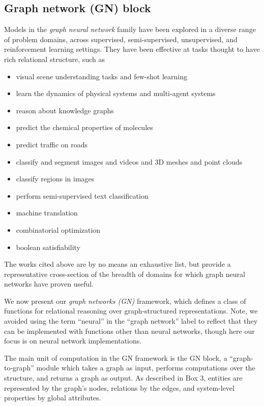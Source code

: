 \documentclass[10pt]{book}
\let\defaultmarginpar\marginpar
\renewcommand\marginpar[2][]{\defaultmarginpar{\itshape\color{gray}#2}}
\begin{document}
\subsection{Graph network (GN) block}
\label{sec:model-computational}

Models in the \emph{graph neural network}\marginpar{graph neural networks} family have been explored in a diverse range of problem domains, across supervised, semi-supervised, unsupervised, and reinforcement learning settings. They have been effective at tasks thought to have rich relational structure, such as
\begin{itemize}
    \item visual scene understanding tasks and few-shot learning
    \item learn the dynamics of physical systems and multi-agent systems 
    \item reason about knowledge graphs
    \item predict the chemical properties of molecules
    \item predict traffic on roads
    \item classify and segment images and videos and 3D meshes and point clouds
    \item classify regions in images
    \item perform semi-supervised text classification
    \item machine translation
    \item combinatorial optimization
    \item boolean satisfiability
\end{itemize}

The works cited above are by no means an exhaustive list, but provide a representative cross-section of the breadth of domains for which graph neural networks have proven useful.

We now present our \emph{graph networks (GN)}\marginpar{graph networks (GN)} framework, which defines a class of functions for relational reasoning over graph-structured representations.  Note, we avoided using the term ``neural'' in the ``graph network'' label to reflect that they can be implemented with functions other than neural networks, though here our focus is on neural network implementations.

The main unit of computation in the GN framework is the GN block, a ``graph-to-graph'' module which takes a graph as input, performs computations over the structure, and returns a graph as output. As described in Box 3, entities are represented by the graph's nodes, relations by the edges, and system-level properties by global attributes.
\end{document}
